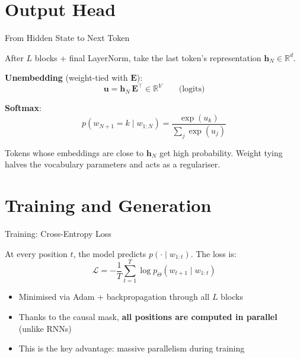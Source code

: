 \documentclass[aspectratio=169, professionalfonts]{beamer}
\def\R{\mathbb{R}}
\begin{document}
\section{Output Head}

\begin{frame}{From Hidden State to Next Token}

After $L$ blocks + final LayerNorm, take the last token's
representation $\mathbf{h}_N \in \R^d$.

\bigskip

\textbf{Unembedding} (weight-tied with $\mathbf{E}$):
$$\mathbf{u} = \mathbf{h}_N\,\mathbf{E}^\top \in \R^V
  \qquad\text{(logits)}$$

\textbf{Softmax}:
$$p(w_{N+1} = k \mid w_{1:N})
  = \frac{\exp(u_k)}{\sum_j \exp(u_j)}$$

\bigskip

Tokens whose embeddings are close to $\mathbf{h}_N$ get high
probability. Weight tying halves the vocabulary parameters
and acts as a regulariser.

\end{frame}

\section{Training and Generation}

\begin{frame}{Training: Cross-Entropy Loss}

At every position $t$, the model predicts $p(\cdot \mid w_{1:t})$.
The loss is:
$$\mathcal{L} = -\frac{1}{T}\sum_{t=1}^{T}
  \log p_\Theta(w_{t+1} \mid w_{1:t})$$

\bigskip

\begin{itemize}
  \item Minimised via Adam + backpropagation through all $L$ blocks
  \item Thanks to the causal mask, \textbf{all positions are computed
        in parallel} (unlike RNNs)
  \item This is the key advantage: massive parallelism during training
\end{itemize}

\end{frame}
\end{document}
